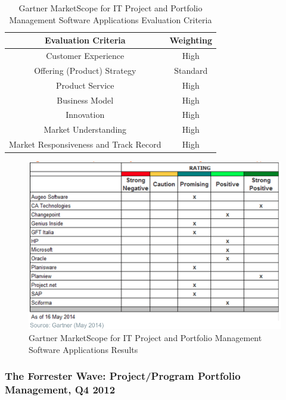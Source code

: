 \begin{table}[h]
\centering
\begin{tabular}{|c|c|}
\hline
\textbf{Evaluation Criteria} & \textbf{Weighting} \\ \hline
Customer Experience & High \\ \hline
Offering (Product) Strategy & Standard \\ \hline
Product Service & High \\ \hline
Business Model & High \\ \hline
Innovation & High \\ \hline
Market Understanding & High \\ \hline
Market Responsiveness and Track Record & High \\ \hline
\end{tabular}
\caption{Gartner MarketScope for IT Project and Portfolio Management Software Applications Evaluation Criteria}
\label{my-label}
\end{table}

\begin{figure}
\centering
\includegraphics{img/MarketScopePPM.png}
\caption{Gartner MarketScope for IT Project and Portfolio Management Software Applications Results}
\end{figure}


\subsubsection{The Forrester Wave: Project/Program Portfolio Management, Q4 2012}

